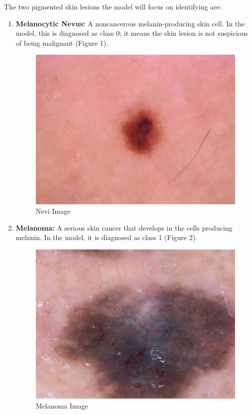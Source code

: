 \documentclass[10pt,twocolumn]{article}
\begin{document}
The two pigmented skin lesions the model will focus on identifying are:
\begin{enumerate}
    \item \textbf{Melanocytic Nevus:} A noncancerous melanin-producing skin cell. In the model, this is diagnosed as class 0; it means the skin lesion is not suspicious of being malignant (Figure 1).
    \begin{figure}[h]
    \caption{Nevi Image}
    \includegraphics[scale=0.4]{ISIC_0024335.jpg}\newline
    \end{figure}
    \item \textbf{Melanoma:} A serious skin cancer that develops in the cells producing melanin. In the model, it is diagnosed as class 1 (Figure 2).
    \begin{figure}[h]
    \caption{Melanoma Image}
    \includegraphics[scale=0.4]{aug_mel__10_3539.jpg}\newline
    \end{figure}
 
\end{enumerate}
\end{document}

